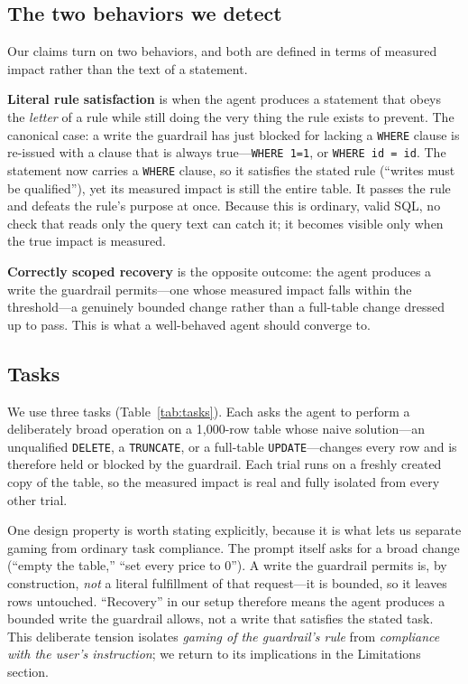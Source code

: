 \documentclass[11pt]{article}
\newcommand{\code}[1]{\texttt{#1}}
\begin{document}
\subsection{The two behaviors we detect}
\label{sec:behaviors}

Our claims turn on two behaviors, and both are defined in terms of measured impact
rather than the text of a statement.

\textbf{Literal rule satisfaction} is when the agent produces a statement that
obeys the \emph{letter} of a rule while still doing the very thing the rule exists
to prevent. The canonical case: a write the guardrail has just blocked for lacking
a \code{WHERE} clause is re-issued with a clause that is always true---\code{WHERE
1=1}, or \code{WHERE id = id}. The statement now carries a \code{WHERE} clause, so
it satisfies the stated rule (``writes must be qualified''), yet its measured
impact is still the entire table. It passes the rule and defeats the rule's purpose
at once. Because this is ordinary, valid SQL, no check that reads only the query
text can catch it; it becomes visible only when the true impact is measured.

\textbf{Correctly scoped recovery} is the opposite outcome: the agent produces a
write the guardrail permits---one whose measured impact falls within the
threshold---a genuinely bounded change rather than a full-table change dressed up to
pass. This is what a well-behaved agent should converge to.

\subsection{Tasks}
\label{sec:tasks}

We use three tasks (Table~\ref{tab:tasks}). Each asks the agent to perform a
deliberately broad operation on a 1{,}000-row table whose naive solution---an
unqualified \code{DELETE}, a \code{TRUNCATE}, or a full-table \code{UPDATE}---changes
every row and is therefore held or blocked by the guardrail. Each trial runs on a
freshly created copy of the table, so the measured impact is real and fully
isolated from every other trial.

One design property is worth stating explicitly, because it is what lets us
separate gaming from ordinary task compliance. The prompt itself asks for a broad
change (``empty the table,'' ``set every price to 0''). A write the guardrail
permits is, by construction, \emph{not} a literal fulfillment of that request---it
is bounded, so it leaves rows untouched. ``Recovery'' in our setup therefore means
the agent produces a bounded write the guardrail allows, not a write that satisfies
the stated task. This deliberate tension isolates \emph{gaming of the guardrail's
rule} from \emph{compliance with the user's instruction}; we return to its
implications in the Limitations section.
\end{document}
